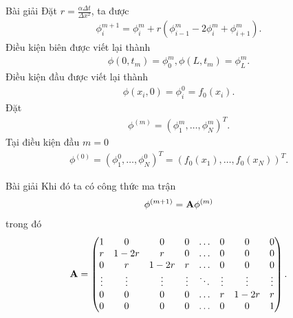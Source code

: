 \documentclass[9pt]{beamer}
\numberwithin{equation}{section}
\begin{document}
\begin{frame}
\begin{exampleblock}{Bài giải}
    Đặt $r = \frac{\alpha \Delta t}{\Delta x^2}$, ta được
    \begin{align}
        \phi_i^{m+1} = \phi_i^m + r\left(\phi_{i-1}^m - 2\phi_i^m + \phi_{i+1}^m\right). \label{deq:heat:ftcs}
    \end{align}
    Điều kiện biên được viết lại thành
    \begin{align*}
        \phi(0, t_m) = \phi_0^m, \phi(L, t_m) = \phi_L^m.
    \end{align*}
    Điều kiện đầu được viết lại thành
    \begin{align*}
        \phi(x_i, 0) = \phi_i^0 = f_0(x_i).
    \end{align*}
    Đặt
    \begin{align*}
        \phi^{(m)} = (\phi_1^m, \ldots, \phi_N^m)^T.
    \end{align*}
    Tại điều kiện đầu $m = 0$
    \begin{align*}
        \phi^{(0)} = (\phi_1^0, \ldots, \phi_N^0)^T = (f_0(x_1), \ldots, f_0(x_N))^T.
    \end{align*}
\end{exampleblock}
\end{frame}

\begin{frame}
\begin{exampleblock}{Bài giải}
    Khi đó ta có công thức ma trận
    \begin{align*}
        \phi^{(m+1)} = {\bf A} \phi^{(m)}
    \end{align*}
    trong đó
    \begin{align*}
        {\bf A} = \begin{pmatrix}
        1 & 0 & 0 & 0 & \ldots & 0 & 0 & 0 \\
        r & 1-2r & r & 0 & \ldots & 0 & 0 & 0 \\
        0 & r & 1-2r & r & \ldots & 0 & 0 & 0 \\
        \vdots & \vdots & \vdots & \vdots & \ddots & \vdots & \vdots & \vdots \\
        0 & 0 & 0 & 0 & \ldots & r & 1-2r & r \\
        0 & 0 & 0 & 0 & \ldots & 0 & 0 & 1
        \end{pmatrix}.
    \end{align*}
\end{exampleblock}
\end{frame}
\end{document}

